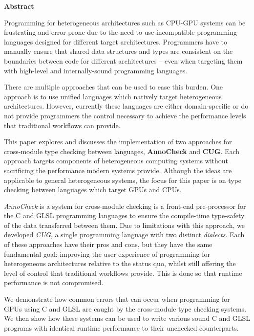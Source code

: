 \newpage
{\Huge \bf Abstract}
\vspace{24pt}






Programming for heterogeneous architectures such as CPU-GPU systems can be
frustrating and error-prone due to the need to use incompatible programming
languages designed for different target architectures. Programmers have to
manually ensure that shared data structures and types are consistent on the
boundaries between code for different architectures -- even when targeting them
with high-level and internally-sound programming languages.

There are multiple approaches that can be used to ease this burden. One
approach is to use unified languages which natively target heterogeneous
architectures. However, currently these languages are either domain-specific or
do not provide programmers the control necessary to achieve the performance
levels that traditional workflows can provide.

This paper explores and discusses the implementation of two approaches for
cross-module type checking between languages, \textbf{AnnoCheck} and
\textbf{CUG}. Each approach targets components of heterogeneous computing
systems without sacrificing the performance modern systems provide. Although
the ideas are applicable to general heterogeneous systems, the focus for this
paper is on type checking between languages which target GPUs and CPUs.

\textit{AnnoCheck} is a system for cross-module checking is a front-end
pre-processor for the C and GLSL programming languages to ensure the
compile-time type-safety of the data transferred between them. Due to
limitations with this approach, we developed \textit{CUG}, a single programming
language with two distinct \textit{dialects}. Each of these approaches have
their pros and cons, but they have the same fundamental goal: improving the
user experience of programming for heterogeneous architectures relative to the
status quo, whilst still offering the level of control that traditional
workflows provide. This is done so that runtime performance is not compromised.

We demonstrate how common errors that can occur when programming for GPUs using
C and GLSL are caught by the cross-module type checking systems. We then show
how these systems can be used to write various sound C and GLSL programs with
identical runtime performance to their unchecked counterparts.

\newpage
\vspace*{\fill}
